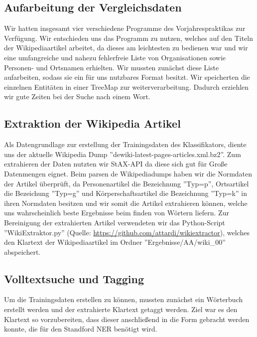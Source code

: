 \documentclass[a4paper]{article}
\begin{document}
\subsection{Aufarbeitung der Vergleichsdaten}
Wir hatten insgesamt vier verschiedene Programme des Vorjahrespraktikas zur Verfügung. Wir entschieden uns das Programm zu nutzen, welches auf den Titeln der Wikipediaartikel arbeitet, da dieses am leichtesten zu bedienen war und wir eine umfangreiche und nahezu fehlerfreie Liste von Organisationen sowie Personen- und Ortsnamen erhielten. Wir mussten zunächst diese Liste aufarbeiten, sodass sie ein für uns nutzbares Format besitzt. Wir speicherten die einzelnen Entitäten in einer TreeMap zur weiterverarbeitung. Dadurch erziehlen wir gute Zeiten bei der Suche nach einem Wort.

\subsection{Extraktion der Wikipedia Artikel}
Als Datengrundlage zur erstellung der Trainingsdaten des Klassifikators, diente uns der aktuelle Wikipedia Dump ''dewiki-latest-pages-articles.xml.bz2''. Zum extrahieren der Daten nutzten wir StAX-API da diese sich gut für Große Datenmengen eignet. Beim parsen de Wikipediadumps haben wir die Normdaten der Artikel überprüft, da Personenartikel die Bezeichnung ''Typ=p'', Ortsartikel die Bezeichung ''Typ=g'' und Körperschaftsartikel die Bezeichnung ''Typ=k'' in ihren Normdaten besitzen und wir somit die Artikel extrahieren können, welche uns wahrscheinlich beste Ergebnisse beim finden von Wörtern liefern. Zur Bereinigung der extrahierten Artikel verwendeten wir das Python-Script ''WikiExtraktor.py'' (Quelle: \url{https://github.com/attardi/wikiextractor}), welches den Klartext der Wikipediaartikel im Ordner ''Ergebnisse/AA/wiki\_00'' abspeichert.

\subsection{Volltextsuche und Tagging}
Um die Trainingsdaten erstellen zu können, mussten zunächst ein Wörterbuch erstellt werden und der extrahierte Klartext getaggt werden.
Ziel war es den Klartext so vorzubereiten, dass dieser anschließend in die Form gebracht werden konnte, die für den Standford NER benötigt wird.
\end{document}

